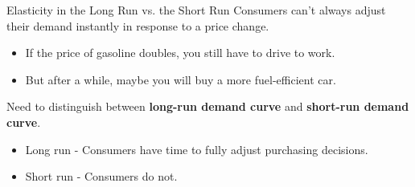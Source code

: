 \documentclass[12pt,t]{beamer}
\begin{document}
\begin{frame}{Elasticity in the Long Run vs. the Short Run}
  Consumers can't always adjust their demand instantly in response to a price change.
  \begin{itemize}
    \item If the price of gasoline doubles, you still have to drive to work.

    \item But after a while, maybe you will buy a more fuel-efficient car.
  \end{itemize}

  \bigskip
  Need to distinguish between \textbf{long-run demand curve} and \textbf{short-run demand curve}.
  \begin{itemize}
    \item Long run - Consumers have time to fully adjust purchasing decisions.

    \item Short run - Consumers do not.
  \end{itemize}
\end{frame}
\end{document}
